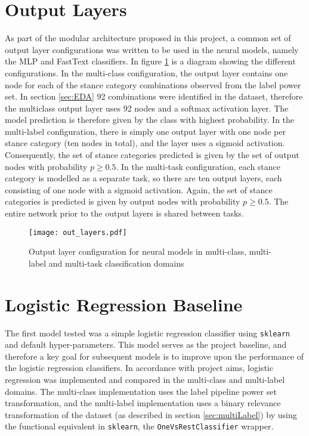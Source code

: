 \documentclass[Dissertation.tex]{subfiles}
\begin{document}
\section{Output Layers}\label{sec:outputLayers}
As part of the modular architecture proposed in this project, a common set of output layer configurations was written to be used in the neural models, namely the MLP and FastText classifiers. In figure \ref{fig:outLayers} is a diagram showing the different configurations. In the multi-class configuration, the output layer contains one node for each of the stance category combinations observed from the label power set. In section \ref{sec:EDA} 92 combinations were identified in the dataset,  therefore the multiclass output layer uses 92 nodes and a softmax activation layer. The model prediction is therefore given by the class with highest probability. In the multi-label configuration, there is simply one output layer with one node per stance category (ten nodes in total), and the layer uses a sigmoid activation. Consequently, the set of stance categories predicted is given by the set of output nodes with probability $ p\geq0.5 $. In the multi-task configuration, each stance category is modelled as a separate task, so there are ten output layers, each consisting of one node with a sigmoid activation. Again, the set of stance categories is predicted is given by output nodes with probability $ p\geq0.5 $. The entire network prior to the output layers is shared between tasks.

\begin{figure}
	\centering
	\texttt{[image: out\_layers.pdf]}
	\caption{Output layer configuration for neural models in multi-class, multi-label and multi-task classification domains}
	\label{fig:outLayers}
\end{figure}

\section{Logistic Regression Baseline}
The first model tested was a simple logistic regression classifier using \texttt{sklearn} and default hyper-parameters. This model serves as the project baseline, and therefore a key goal for subsequent models is to improve upon the performance of the logistic regression classifiers. In accordance with project aims, logistic regression was implemented and compared in the multi-class and multi-label domains. The multi-class implementation uses the label pipeline power set transformation, and the multi-label implementation uses a binary relevance transformation of the dataset (as described in section \ref{sec:multiLabel}) by using the functional equivalent in \texttt{sklearn}, the \texttt{OneVsRestClassifier} wrapper.
\end{document}
